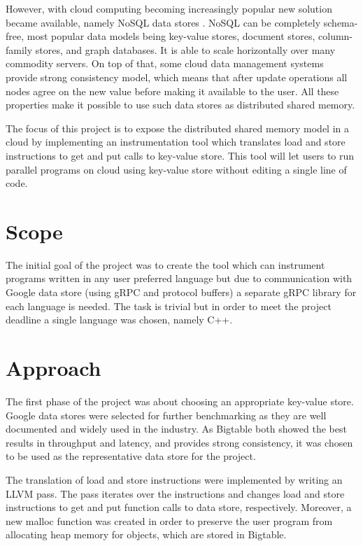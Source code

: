 \documentclass[bsc,frontabs,twoside,singlespacing,parskip,deptreport]{infthesis}     %
\begin{document}
However, with cloud computing becoming increasingly popular new solution became available, namely NoSQL data stores \citep{nosql-data-stores}. NoSQL can be completely schema-free, most popular data models being key-value stores, document stores, column-family stores, and graph databases. It is able to scale horizontally over many commodity servers. On top of that, some cloud data management systems provide strong consistency model, which means that after update operations all nodes agree on the new value before making it available to the user. All these properties make it possible to use such data stores as distributed shared memory.

The focus of this project is to expose the distributed shared memory model in a cloud by implementing an instrumentation tool which translates load and store instructions to get and put calls to key-value store. This tool will let users to run parallel programs on cloud using key-value store without editing a single line of code.

\section{Scope}

The initial goal of the project was to create the tool which can instrument programs written in any user preferred language but due to communication with Google data store (using gRPC and protocol buffers) a separate gRPC library for each language is needed. The task is trivial but in order to meet the project deadline a single language was chosen, namely C++.


\section{Approach}

The first phase of the project was about choosing an appropriate key-value store. Google data stores were selected for further benchmarking as they are well documented and widely used in the industry. As Bigtable both showed the best results in throughput and latency, and provides strong consistency, it was chosen to be used as the representative data store for the project. 


The translation of load and store instructions were implemented by writing an LLVM pass. The pass iterates over the instructions and changes load and store instructions to get and put function calls to data store, respectively. Moreover, a new malloc function was created in order to preserve the user program from allocating heap memory for objects, which are stored in Bigtable.
\end{document}
